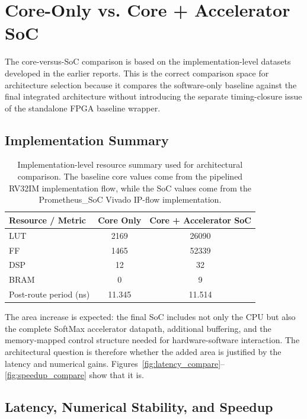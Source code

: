 \documentclass[11pt]{article}
\begin{document}
\section{Core-Only vs. Core + Accelerator SoC}

The core-versus-SoC comparison is based on the implementation-level datasets developed in the earlier reports. This is the correct comparison space for architecture selection because it compares the software-only baseline against the final integrated architecture without introducing the separate timing-closure issue of the standalone FPGA baseline wrapper.

\subsection{Implementation Summary}

\begin{table}[ht]
\centering
\caption{Implementation-level resource summary used for architectural comparison. The baseline core values come from the pipelined RV32IM implementation flow, while the SoC values come from the Prometheus\_SoC Vivado IP-flow implementation.}
\label{tab:impl_compare}
\begin{tabular}{lcc}
\toprule
Resource / Metric & Core Only & Core + Accelerator SoC \\
\midrule
LUT & 2169 & 26090 \\
FF & 1465 & 52339 \\
DSP & 12 & 32 \\
BRAM & 0 & 9 \\
Post-route period (ns) & 11.345 & 11.514 \\
\bottomrule
\end{tabular}
\end{table}

The area increase is expected: the final SoC includes not only the CPU but also the complete SoftMax accelerator datapath, additional buffering, and the memory-mapped control structure needed for hardware-software interaction. The architectural question is therefore whether the added area is justified by the latency and numerical gains. Figures~\ref{fig:latency_compare}--\ref{fig:speedup_compare} show that it is.

\subsection{Latency, Numerical Stability, and Speedup}
\end{document}
